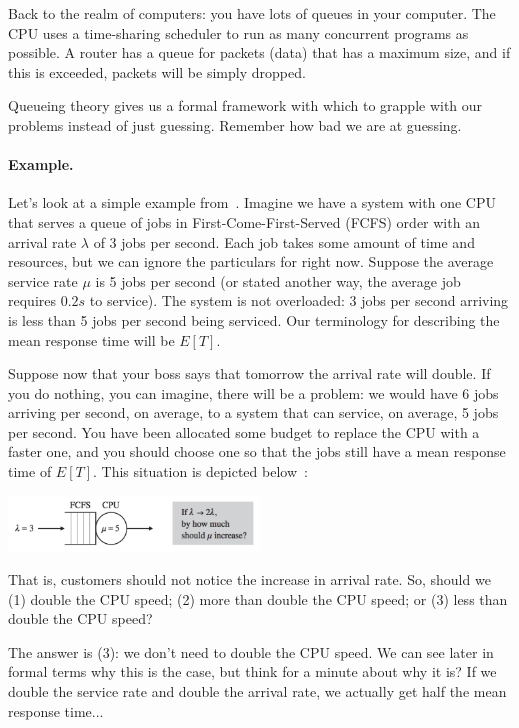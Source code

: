 \documentclass[a4paper]{report}
\begin{document}
Back to the realm of computers: you have lots of queues in your computer. The CPU uses a time-sharing scheduler to run as many concurrent programs as possible. A router has a queue for packets (data) that has a maximum size, and if this is exceeded, packets will be simply dropped. 

Queueing theory gives us a formal framework with which to grapple with our problems instead of just guessing. Remember how bad we are at guessing. 


\paragraph{Example.} Let's look at a simple example from~\cite{pmd}. Imagine we have a system with one CPU that serves a queue of jobs in First-Come-First-Served (FCFS) order with an arrival rate $\lambda$ of 3 jobs per second. Each job takes some amount of time and resources, but we can ignore the particulars for right now. Suppose the average service rate $\mu$ is 5 jobs per second (or stated another way, the average job requires $0.2s$ to service). The system is not overloaded: 3 jobs per second arriving is less than 5 jobs per second being serviced. Our terminology for describing the mean response time will be $E[T]$. 


Suppose now that your boss says that tomorrow the arrival rate will double. If you do nothing, you can imagine, there will be a problem: we would have 6 jobs arriving per second, on average, to a system that can service, on average, 5 jobs per second. You have been allocated some budget to replace the CPU with a faster one, and you should choose one so that the jobs still have a mean response time of $E[T]$. This situation is depicted below~\cite{pmd}:


\begin{center}
	\includegraphics[width=0.5\textwidth]{images/qt-example1.png}
\end{center}

That is, customers should not notice the increase in arrival rate. So, should we (1) double the CPU speed; (2) more than double the CPU speed; or (3) less than double the CPU speed?

The answer is (3): we don't need to double the CPU speed. We can see later in formal terms why this is the case, but think for a minute about why it is? If we double the service rate and double the arrival rate, we actually get half the mean response time...
\end{document}
